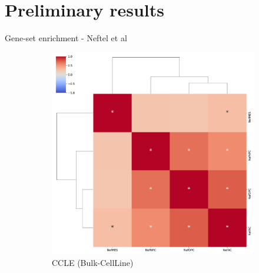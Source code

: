 \documentclass[aspectratio=169,9pt]{beamer}
\begin{document}
    \section{Preliminary results}
    \begin{frame}{Gene-set enrichment - Neftel et al}
        \begin{adjustwidth}{-5cm}{-5cm}
            \centering
            \begin{figure}
                \centering
                \begin{subfigure}[c]{0.48\textwidth}
                    \centering
                    \includegraphics[width=\textwidth]{GSEA_CCLE_corrplot_Nef}
                    \caption{CCLE (Bulk-CellLine)}
                \end{subfigure}
                \begin{subfigure}[c]{0.48\textwidth}
                    \centering

\end{subfigure}
\end{figure}
\end{adjustwidth}
\end{frame}
\end{document}
